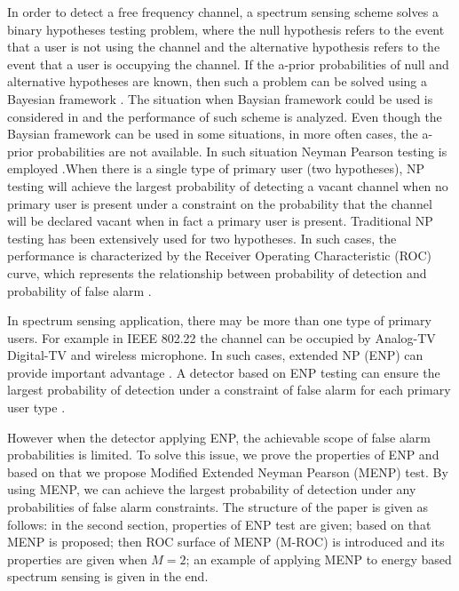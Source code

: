 \documentclass[12pt,journal,a4paper,twoside,onecolumn]{IEEEtran}
\begin{document}
\begin{spacing}{2.5}
In order to detect a free frequency channel, a spectrum sensing scheme solves a binary hypotheses testing problem, where the null hypothesis refers to the event that a user is not using the channel and the alternative hypothesis refers to the event that a user is occupying the channel. If the a-prior probabilities of null and alternative hypotheses are known, then such a problem can be solved using a Bayesian framework \cite{poor1994introduction}. The situation when Baysian framework could be used is considered in \cite{zeng2010review} and the performance of such scheme is analyzed.
Even though the Baysian framework can be used in some situations, in more often cases, the a-prior probabilities are not available. In such situation Neyman Pearson testing is employed \cite{poor1994introduction}.When there is a single type of primary user (two hypotheses), NP testing will achieve the largest probability of detecting a vacant channel when no primary user is present under a constraint on the probability that the channel will be declared vacant when in fact a primary user is present.
Traditional NP testing has been extensively used for two hypotheses. In such cases,  the performance is characterized by the Receiver Operating Characteristic (ROC) curve, which represents the relationship between probability of detection and probability of false alarm \cite{poor1994introduction}.

In spectrum sensing application, there may be more than one type of primary users. For example in IEEE 802.22 \cite{shellhammer2008spectrum} the channel can be occupied by Analog-TV Digital-TV and wireless microphone. In such cases, extended NP (ENP) can provide important advantage \cite{zhang1999design}. A detector based on ENP testing can ensure the largest probability of detection under a constraint of false alarm for each primary user type \cite{LehmannTest}.

However when the detector applying ENP,  the achievable scope of false alarm probabilities is limited. To solve this issue, we prove the properties of ENP and based on that we propose Modified Extended Neyman Pearson (MENP) test. By using MENP, we can achieve the largest probability of detection under any probabilities of false alarm constraints.
The structure of the paper is given as follows: in the second section, properties of ENP test are given; based on that MENP is proposed; then ROC surface of MENP (M-ROC) is introduced and its properties are  given when $M = 2$; an example of applying MENP to energy based spectrum sensing is given in the end.


\end{spacing}
\end{document}

